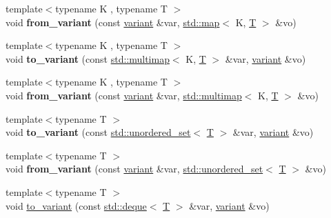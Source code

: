 \begin{DoxyCompactItemize}
\item 
\mbox{\label{namespacefc_a1d2392993bd543dd0cb6878f2f1e0764}} 
{\footnotesize template$<$typename K , typename T $>$ }\\void {\bfseries from\+\_\+variant} (const \mbox{\hyperlink{classfc_1_1variant}{variant}} \&var, \mbox{\hyperlink{classstd_1_1map}{std\+::map}}$<$ K, \mbox{\hyperlink{struct_t}{T}} $>$ \&vo)
\item 
\mbox{\label{namespacefc_a96a08bd68687f9592e5d3a60b28ccf53}} 
{\footnotesize template$<$typename K , typename T $>$ }\\void {\bfseries to\+\_\+variant} (const \mbox{\hyperlink{classstd_1_1multimap}{std\+::multimap}}$<$ K, \mbox{\hyperlink{struct_t}{T}} $>$ \&var, \mbox{\hyperlink{classfc_1_1variant}{variant}} \&vo)
\item 
\mbox{\label{namespacefc_a52b385ae420e58becc325d8fd4ae549b}} 
{\footnotesize template$<$typename K , typename T $>$ }\\void {\bfseries from\+\_\+variant} (const \mbox{\hyperlink{classfc_1_1variant}{variant}} \&var, \mbox{\hyperlink{classstd_1_1multimap}{std\+::multimap}}$<$ K, \mbox{\hyperlink{struct_t}{T}} $>$ \&vo)
\item 
\mbox{\label{namespacefc_a07c975cfccb7d95593eca65fc9503764}} 
{\footnotesize template$<$typename T $>$ }\\void {\bfseries to\+\_\+variant} (const \mbox{\hyperlink{classstd_1_1unordered__set}{std\+::unordered\+\_\+set}}$<$ \mbox{\hyperlink{struct_t}{T}} $>$ \&var, \mbox{\hyperlink{classfc_1_1variant}{variant}} \&vo)
\item 
\mbox{\label{namespacefc_a95d1792b10d39c366aa92f6d188558c6}} 
{\footnotesize template$<$typename T $>$ }\\void {\bfseries from\+\_\+variant} (const \mbox{\hyperlink{classfc_1_1variant}{variant}} \&var, \mbox{\hyperlink{classstd_1_1unordered__set}{std\+::unordered\+\_\+set}}$<$ \mbox{\hyperlink{struct_t}{T}} $>$ \&vo)
\item 
{\footnotesize template$<$typename T $>$ }\\void \mbox{\hyperlink{namespacefc_ad2c253eb956ce0781fde7ce73d3ff1c8}{to\+\_\+variant}} (const \mbox{\hyperlink{classstd_1_1deque}{std\+::deque}}$<$ \mbox{\hyperlink{struct_t}{T}} $>$ \&var, \mbox{\hyperlink{classfc_1_1variant}{variant}} \&vo)

\end{DoxyCompactItemize}
